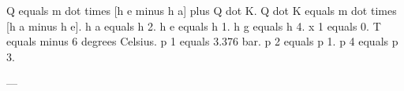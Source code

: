 Q equals m dot times [h e minus h a] plus Q dot K.  
Q dot K equals m dot times [h a minus h e].  
h a equals h 2.  
h e equals h 1.  
h g equals h 4.  
x 1 equals 0.  
T equals minus 6 degrees Celsius.  
p 1 equals 3.376 bar.  
p 2 equals p 1.  
p 4 equals p 3.  

---
